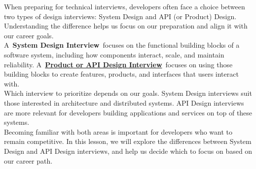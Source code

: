 

When preparing for technical interviews, developers often face a choice between two types of design interviews: System Design and API (or Product) Design. Understanding the difference helps us focus on our preparation and align it with our career goals.
\\
A~\textbf{System Design Interview}~focuses on the functional building blocks of a software system, including how components interact, scale, and maintain reliability. A~\href{https://www.educative.io/courses/grokking-the-product-architecture-interview}{\textbf{Product or API Design Interview}}~focuses on using those building blocks to create features, products, and interfaces that users interact with.
\\
Which interview to prioritize depends on our goals. System Design interviews suit those interested in architecture and distributed systems. API Design interviews are more relevant for developers building applications and services on top of these systems.
\\
Becoming familiar with both areas is important for developers who want to remain competitive. In this lesson, we will explore the differences between System Design and API Design interviews, and help us decide which to focus on based on our career path.

